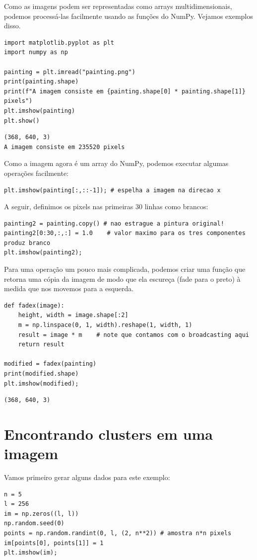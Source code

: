 \documentclass[11pt,a4paper]{article}
\begin{document}
Como as imagens podem ser representadas como arrays multidimensionais, podemos processá-las facilmente usando as funções do NumPy. Vejamos exemplos disso.

\begin{lstlisting}
import matplotlib.pyplot as plt
import numpy as np

painting = plt.imread("painting.png")
print(painting.shape)
print(f"A imagem consiste em {painting.shape[0] * painting.shape[1]} pixels")
plt.imshow(painting)
plt.show()
\end{lstlisting}
\begin{verbatim}
(368, 640, 3)
A imagem consiste em 235520 pixels
\end{verbatim}

Como a imagem agora é um array do NumPy, podemos executar algumas operações facilmente:
\begin{lstlisting}
plt.imshow(painting[:,::-1]); # espelha a imagem na direcao x
\end{lstlisting}

A seguir, definimos os pixels nas primeiras 30 linhas como brancos:
\begin{lstlisting}
painting2 = painting.copy() # nao estrague a pintura original!
painting2[0:30,:,:] = 1.0    # valor maximo para os tres componentes produz branco
plt.imshow(painting2);
\end{lstlisting}

Para uma operação um pouco mais complicada, podemos criar uma função que retorna uma cópia da imagem de modo que ela escureça (fade para o preto) à medida que nos movemos para a esquerda.
\begin{lstlisting}
def fadex(image):
    height, width = image.shape[:2]
    m = np.linspace(0, 1, width).reshape(1, width, 1)
    result = image * m    # note que contamos com o broadcasting aqui
    return result

modified = fadex(painting)
print(modified.shape)
plt.imshow(modified);
\end{lstlisting}
\begin{verbatim}
(368, 640, 3)
\end{verbatim}

\section{Encontrando clusters em uma imagem}

Vamos primeiro gerar alguns dados para este exemplo:
\begin{lstlisting}
n = 5
l = 256
im = np.zeros((l, l))
np.random.seed(0)
points = np.random.randint(0, l, (2, n**2)) # amostra n*n pixels
im[points[0], points[1]] = 1
plt.imshow(im);
\end{lstlisting}
\end{document}
